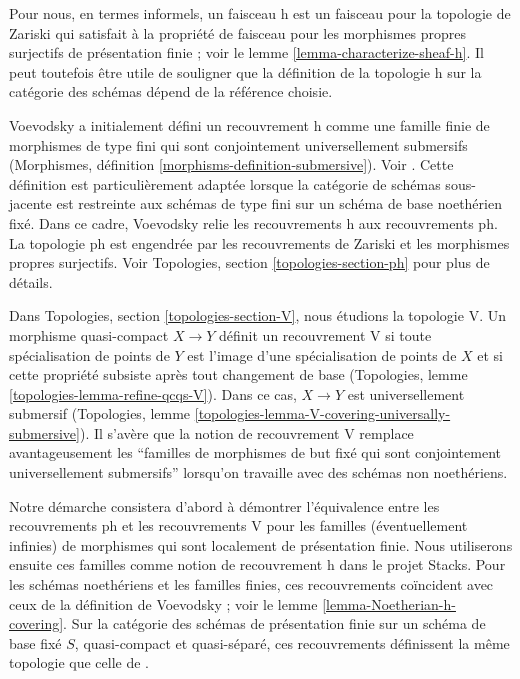 \noindent
Pour nous, en termes informels, un faisceau h est un faisceau pour la topologie de Zariski
qui satisfait à la propriété de faisceau pour les morphismes propres surjectifs
de présentation finie ; voir le lemme \ref{lemma-characterize-sheaf-h}.
Il peut toutefois être utile de souligner que la définition de la topologie h
sur la catégorie des schémas dépend de la référence choisie.

\medskip\noindent
Voevodsky a initialement défini un
recouvrement h comme une famille finie de morphismes de type fini qui sont
conjointement universellement submersifs (Morphismes, définition
\ref{morphisms-definition-submersive}). Voir \cite[Definition 3.1.2]{Voevodsky}.
Cette définition est particulièrement adaptée lorsque la catégorie de schémas sous-jacente est
restreinte aux schémas de type fini sur un schéma de base noethérien fixé.
Dans ce cadre, Voevodsky relie les recouvrements h aux recouvrements ph.
La topologie ph est engendrée par les recouvrements de Zariski et les morphismes propres
surjectifs. Voir Topologies, section \ref{topologies-section-ph}
pour plus de détails.

\medskip\noindent
Dans Topologies, section \ref{topologies-section-V}, nous étudions la topologie V.
Un morphisme quasi-compact $X \to Y$ définit un recouvrement V si toute spécialisation
de points de $Y$ est l'image d'une spécialisation de points de $X$
et si cette propriété subsiste après tout changement de base
(Topologies, lemme \ref{topologies-lemma-refine-qcqs-V}).
Dans ce cas, $X \to Y$ est universellement submersif
(Topologies, lemme \ref{topologies-lemma-V-covering-universally-submersive}).
Il s'avère que la notion de recouvrement V remplace avantageusement les
``familles de morphismes de but fixé qui sont
conjointement universellement submersifs'' lorsqu'on travaille avec des schémas non noethériens.

\medskip\noindent
Notre démarche consistera d'abord à démontrer l'équivalence entre les recouvrements ph et
les recouvrements V pour les familles (éventuellement infinies) de morphismes qui sont
localement de présentation finie. Nous utiliserons ensuite ces familles
comme notion de recouvrement h dans le projet Stacks.
Pour les schémas noethériens et les familles finies, ces recouvrements
coïncident avec ceux de la définition de Voevodsky ; voir le
lemme \ref{lemma-Noetherian-h-covering}.
Sur la catégorie des schémas de présentation finie sur un schéma de base
fixé $S$, quasi-compact et quasi-séparé, ces recouvrements
définissent la même topologie que celle de \cite[Definition 2.7]{Witt-Grass}.

